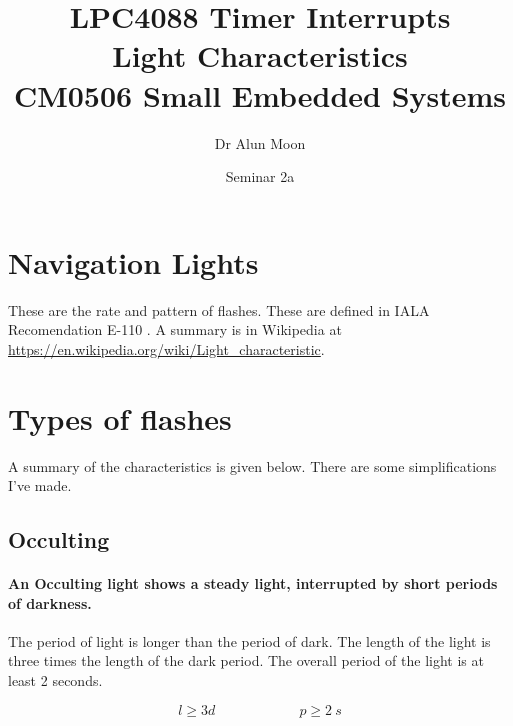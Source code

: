 \documentclass[12pt]{tufte-handout}
\title{LPC4088 Timer Interrupts\\
Light Characteristics\\
\small{CM0506 Small Embedded Systems}}
\author{Dr Alun Moon}
\date{Seminar 2a}
\begin{document}
\maketitle
\section{Navigation Lights}
  These are the rate and pattern of flashes.  These
are defined in IALA Recomendation E-110 \citep{iala-e}.  A summary is
in Wikipedia at
\url{https://en.wikipedia.org/wiki/Light_characteristic}.

\section{Types of flashes}
A summary of the characteristics is given below.  There are some
simplifications I've made.
\subsection{Occulting}
\paragraph{An Occulting light shows a steady light, interrupted by
  short periods of darkness.}  The period of light is longer than the
period of dark.
 The length of the light is three
times the length of the dark period.  The overall period of the light
is at least 2 seconds.

\[
 l \ge 3d \hspace{1in}  p\ge\SI{2}{s}
\]

\end{document}
